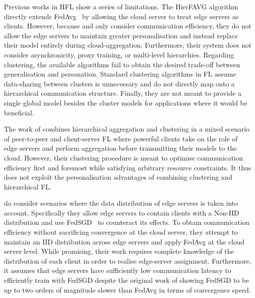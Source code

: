Previous works in HFL show a series of limitations. The HierFAVG algorithm directly extends FedAvg~\citep{FedAvg} by allowing the cloud server to treat edge servers as clients. However, because \citet{Client-Edge-CloudHierFL} and \citet{Hier_Het_Cellular} only consider communication efficiency, they do not allow the edge servers to maintain greater personalisation and instead replace their model entirely during cloud-aggregation. Furthermore, their system does not consider asynchronicity, proxy training, or multi-level hierarchies. Regarding clustering, the available algorithms fail to obtain the desired trade-off between generalisation and personation. Standard clustering algorithms in FL assume data-sharing between clusters is unnecessary and do not directly map onto a hierarchical communication structure. Finally, they are not meant to provide a single global model besides the cluster models for applications where it would be beneficial.


The work of \citet{ResourceEfficientHierAgg} combines hierarchical aggregation and clustering in a mixed scenario of peer-to-peer and client-server FL where powerful clients take on the role of edge servers and perform aggregation before transmitting their models to the cloud. However, their clustering procedure is meant to optimise communication efficiency first and foremost while satisfying arbitrary resource constraints. It thus does not exploit the personalisation advantages of combining clustering and hierarchical FL\@.

\citet{OptimalUserEdgeAssingmentHierFL} do consider scenarios where the data distribution of edge servers is taken into account. Specifically they allow edge servers to contain clients with a Non-IID distribution and use FedSGD~\citep{FedAvg} to counteract its effects. To obtain communication efficiency without sacrificing convergence at the cloud server, they attempt to maintain an IID distribution across edge servers and apply FedAvg at the cloud server level. While promising, their work requires complete knowledge of the distribution of each client in order to realise edge-server assignment. Furthermore, it assumes that edge servers have sufficiently low communication latency to efficiently train with FedSGD despite the original work of \citet{FedAvg} showing FedSGD to be up to two orders of magnitude slower than FedAvg in terms of convergence speed.




